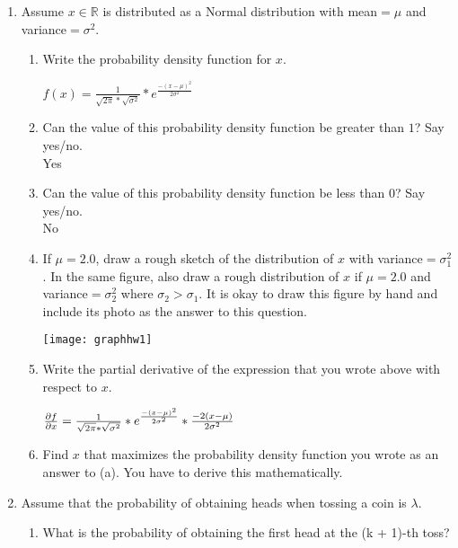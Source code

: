 \documentclass{article}
\begin{document}
\begin{enumerate}
\item Assume $x\in \mathbb{R}$ is distributed as a Normal distribution with mean$=\mu$ and variance$=\sigma^2$. 
\begin{enumerate}
\item Write the probability density function for $x$. 

 \vspace{3mm}
\Large
 $f(x) = \frac{1}{\sqrt{2\pi}*\sqrt{\sigma^2}} *e^\frac{-(x-\mu)^2}{2\sigma^2}$
 \normalsize
 \vspace{3mm}
 
\item Can the value of this probability density function be greater than $1$? Say yes/no.\\
Yes\\
\item Can the value of this probability density function be less than $0$? Say yes/no.\\
No\\
\item If $\mu=2.0$, draw a rough sketch of the distribution of $x$ with variance$=\sigma_1^2$. In the same figure, also draw a rough distribution of $x$ if $\mu=2.0$ and variance$=\sigma_2^2$ where $\sigma_2 > \sigma_1$. It is okay to draw this figure by hand and include its photo as the answer to this question.

\texttt{[image: graphhw1]}

\item Write the partial derivative of the expression that you wrote above with respect to $x$. 

 \vspace{3mm}
\Large
 $\pdv{f}{x} = \frac{1}{\sqrt{2\pi}*\sqrt{\sigma^2}} *e^\frac{-(x-\mu)^2}{2\sigma^2}*\frac{-2(x-\mu)}{2\sigma^2}$
  \vspace{3mm}
 \normalsize
\item Find $x$ that maximizes the probability density function you wrote as an answer to (a). You have to derive this mathematically.
\end{enumerate}



\item Assume that the probability of obtaining heads when tossing a coin is $\lambda$.
\begin{enumerate}
\item What is the probability of obtaining the first head at the (k + 1)-th toss?\\


\end{enumerate}
\end{enumerate}
\end{document}
